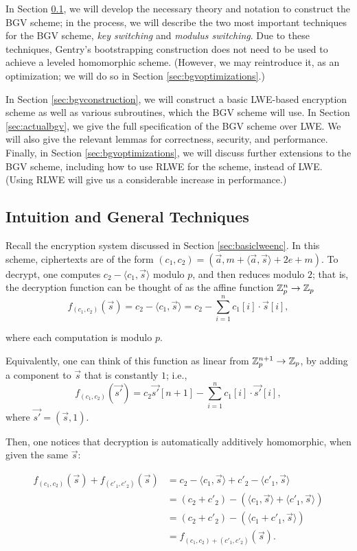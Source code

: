     In Section \ref{sec:bgvintuition}, we will develop the necessary theory and notation to construct the BGV scheme; in the process, we will describe the two most important techniques for the BGV scheme, \emph{key switching} and \emph{modulus switching}. Due to these techniques, Gentry's bootstrapping construction does not need to be used to achieve a leveled homomorphic scheme. (However, we may reintroduce it, as an optimization; we will do so in Section \ref{sec:bgvoptimizations}.)

    In Section \ref{sec:bgvconstruction}, we will construct a basic LWE-based encryption scheme as well as various subroutines, which the BGV scheme will use. In Section \ref{sec:actualbgv}, we give the full specification of the BGV scheme over LWE. We will also give the relevant lemmas for correctness, security, and performance. Finally, in Section \ref{sec:bgvoptimizations}, we will discuss further extensions to the BGV scheme, including how to use RLWE for the scheme, instead of LWE. (Using RLWE will give us a considerable increase in performance.)


\subsection{Intuition and General Techniques} \label{sec:bgvintuition}
    Recall the encryption system discussed in Section \ref{sec:basiclweenc}. In this scheme, ciphertexts are of the form $(c_1, c_2) = (\vec{a}, m + \langle \vec{a}, \vec{s} \rangle + 2e + m)$. To decrypt, one computes $c_2 - \langle c_1, \vec{s} \rangle$ modulo $p$, and then reduces modulo $2$; that is, the decryption function can be thought of as the affine function $\mathbb{Z}_p^n \to \mathbb{Z}_p$
    \[f_{(c_1, c_2)}(\vec{s}) = c_2 - \langle c_1, \vec{s} \rangle = c_2 - \sum_{i = 1}^n c_1[i] \cdot \vec{s} [i],\]

    where each computation is modulo $p$.

    Equivalently, one can think of this function as linear from $\mathbb{Z}_p^{n + 1} \to \mathbb{Z}_p$, by adding a component to $\vec{s}$ that is constantly $1$; i.e.,
    \[f_{(c_1, c_2)}(\vec{s'}) = c_2 \vec{s'}[n + 1] - \sum_{i = 1}^{n} c_1[i] \cdot \vec{s'}[i],\]
    where $\vec{s'} = (\vec{s}, 1)$.

    Then, one notices that decryption is automatically additively homomorphic, when given the same $\vec{s}$:

    \begin{align*}
        f_{(c_1, c_2)}(\vec{s}) + f_{(c'_1, c'_2)}(\vec{s}) &= c_2 - \langle c_1, \vec{s} \rangle + c'_2 - \langle c'_1, \vec{s} \rangle \\
        &= (c_2 + c'_2) - (\langle c_1, \vec{s} \rangle + \langle c'_1, \vec{s} \rangle) \\
        &= (c_2 + c'_2) - (\langle c_1 + c'_1, \vec{s} \rangle) \\
        &= f_{(c_1, c_2) + (c'_1, c'_2)}(\vec{s}).
    \end{align*}


